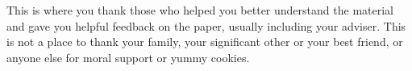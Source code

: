 \documentclass[sigplan,screen,nonacm]{acmart}
\begin{document}
\begin{acks}
This is where you thank those who helped you better understand the material 
and gave you helpful feedback on the paper, usually including your adviser. 
This is not a place to thank your family, your significant other or your best friend, 
or anyone else  for moral support or yummy cookies. 
\end{acks}



\end{document}
